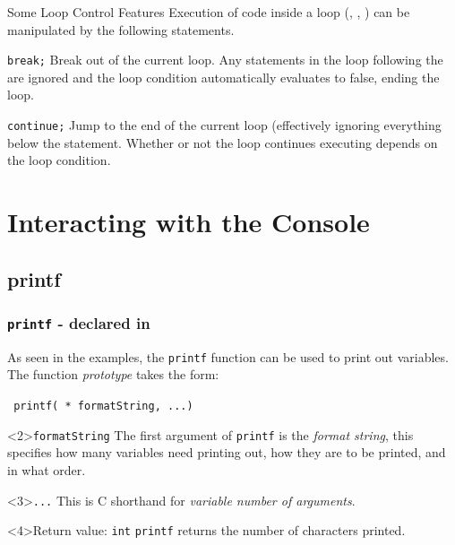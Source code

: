 \documentclass[smaller,handout,table]{beamer}
\begin{document}
\begin{frame}{Some Loop Control Features}
Execution of code inside a loop (, , )
can be manipulated by the following statements.
\begin{block}{\tt break;}
Break out of the current loop. Any statements in the loop following the  are ignored and the loop condition automatically evaluates to false, ending the loop.
\end{block}
\begin{block}{\tt continue;}
Jump to the end of the current loop (effectively ignoring everything below the  statement. Whether or not the loop continues executing depends on the loop condition.
\end{block}
\end{frame}

\section{Interacting with the Console}
\subsection{printf}
\begin{frame}
\frametitle{{\tt printf} - declared in }
As seen in the examples, the {\tt printf} function can be used to print out variables. The function \emph{prototype} takes the form:
\begin{center}
{\tt \alert<4>{} printf(\alert<2>{ * formatString}, \alert<3>{...})}
\end{center}
\begin{block}<2>{{\tt formatString}}
The first argument of {\tt printf} is the \emph{format string}, this specifies how many variables need printing out, how they are to be printed, and in what order.
\end{block}
\begin{block}<3>{{\tt ...}}
This is C shorthand for \emph{variable number of arguments}.
\end{block}

\begin{block}<4>{Return value: {\tt int}}
{\tt printf} returns the number of characters printed.
\end{block}
\end{frame}
\end{document}
